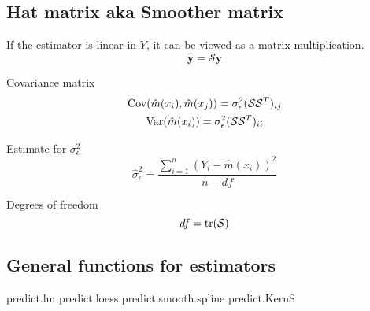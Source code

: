 \subsection{Hat matrix aka Smoother matrix}
\begin{theory}
If the estimator is linear in $Y$, it can be viewed as a matrix-multiplication.
\begin{equation*}
 \hat{\mathbf{y}} = \mathcal{S}\mathbf{y}
\end{equation*}

Covariance matrix
\begin{subequations}
 \begin{gather*}
  \operatorname{Cov}(\hat{m}(x_i), \hat{m}(x_j)) = \sigma_\epsilon^2(\mathcal{S}\mathcal{S}^T)_{ij}\\
  \operatorname{Var}(\hat{m}(x_i)) = \sigma_\epsilon^2(\mathcal{S}\mathcal{S}^T)_{ii}
 \end{gather*}
\end{subequations}

Estimate for $\sigma_\epsilon^2$
\begin{equation*}
 \hat{\sigma}_\epsilon^2 = \frac{\sum_{i=1}^n (Y_i - \hat{m}(x_i))^2}{n - df}
\end{equation*}

Degrees of freedom
\begin{equation*}
 df = \operatorname{tr}(\mathcal{S})
\end{equation*}

\end{theory}
\subsection{General functions for estimators}
\begin{code}
 predict.lm
 predict.loess
 predict.smooth.spline
 predict.KernS
\end{code}
